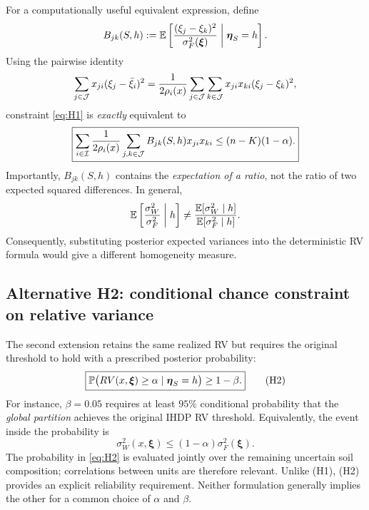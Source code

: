 For a computationally useful equivalent expression, define
\begin{equation}
 B_{jk}(S,h)
 :=\mathbb{E}\left[
  \frac{(\xi_j-\xi_k)^2}{\sigma_F^2(\boldsymbol\xi)}
    \;\middle|\;\boldsymbol\eta_S=h\right].
 \label{eq:posterior-normalized-diff}
\end{equation}
Using the pairwise identity
\begin{equation}
 \sum_{j\in\mathcal{J}}x_{ji}(\xi_j-\bar\xi_i)^2
 =\frac{1}{2\rho_i(x)}
    \sum_{j\in\mathcal{J}}\sum_{k\in\mathcal{J}}
     x_{ji}x_{ki}(\xi_j-\xi_k)^2,
 \label{eq:pairwise-identity}
\end{equation}
constraint \eqref{eq:H1} is \emph{exactly} equivalent to
\begin{equation}
 \boxed{\displaystyle
 \sum_{i\in\mathcal{I}}\frac{1}{2\rho_i(x)}
    \sum_{j,k\in\mathcal{J}} B_{jk}(S,h)x_{ji}x_{ki}
       \leq(n-K)(1-\alpha).}
 \label{eq:H1-pairwise}
\end{equation}
Importantly, $B_{jk}(S,h)$ contains the \emph{expectation of a ratio},
not the ratio of two expected squared differences. In general,
\begin{equation}
 \mathbb{E}\left[\frac{\sigma_W^2}{\sigma_F^2}\;\middle|\;h\right]
 \ne
 \frac{\mathbb{E}[\sigma_W^2\mid h]}{\mathbb{E}[\sigma_F^2\mid h]}.
 \label{eq:expectation-ratio}
\end{equation}
Consequently, substituting posterior expected variances into the
deterministic RV formula would give a different homogeneity measure.

\subsection{Alternative H2: conditional chance constraint on relative variance}
\label{subsec:homogeneity-h2}

The second extension retains the same realized RV but requires the
original threshold to hold with a prescribed posterior probability:
\begin{equation}
 \boxed{\displaystyle
 \mathbb{P}\bigl(RV(x,\boldsymbol\xi)\geq\alpha
        \mid\boldsymbol\eta_S=h\bigr)\geq1-\beta.}
 \tag{H2}\label{eq:H2}
\end{equation}
For instance, $\beta=0.05$ requires at least $95\%$ conditional
probability that the \emph{global partition} achieves the original IHDP
RV threshold. Equivalently, the event inside the probability is
\begin{equation}
 \sigma_W^2(x,\boldsymbol\xi)
 \leq (1-\alpha)\sigma_F^2(\boldsymbol\xi).
 \label{eq:H2-event}
\end{equation}
The probability in \eqref{eq:H2} is evaluated jointly over the
remaining uncertain soil composition; correlations between units are
therefore relevant. Unlike (H1), (H2) provides an explicit reliability
requirement. Neither formulation generally implies the other for a
common choice of $\alpha$ and $\beta$.


